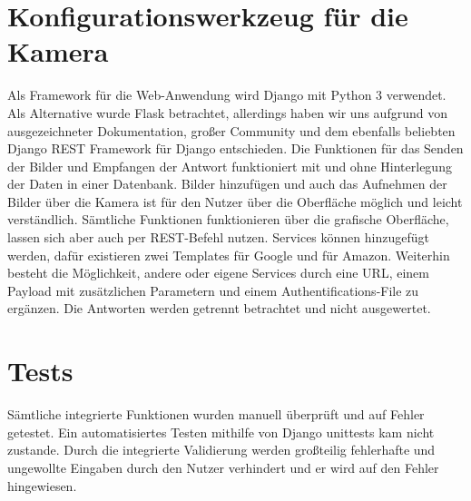 \section{Konfigurationswerkzeug für die Kamera}
Als Framework für die Web-Anwendung wird Django mit Python 3 verwendet. Als Alternative wurde Flask betrachtet, allerdings haben wir uns aufgrund von ausgezeichneter Dokumentation, großer Community und dem ebenfalls beliebten Django REST Framework für Django entschieden.
Die Funktionen für das Senden der Bilder und Empfangen der Antwort funktioniert mit und ohne Hinterlegung der Daten in einer Datenbank. Bilder hinzufügen und auch das Aufnehmen der Bilder über die Kamera ist für den Nutzer über die Oberfläche möglich und leicht verständlich. Sämtliche Funktionen funktionieren über die grafische Oberfläche, lassen sich aber auch per REST-Befehl nutzen. Services können hinzugefügt werden, dafür existieren zwei Templates für Google und für Amazon. Weiterhin besteht die Möglichkeit, andere oder eigene Services durch eine URL, einem Payload mit zusätzlichen Parametern und einem Authentifications-File zu ergänzen.
Die Antworten werden getrennt betrachtet und nicht ausgewertet.

\section{Tests}
Sämtliche integrierte Funktionen wurden manuell überprüft und auf Fehler getestet. Ein automatisiertes Testen mithilfe von Django unittests kam nicht zustande. Durch die integrierte Validierung werden großteilig fehlerhafte und ungewollte Eingaben durch den Nutzer verhindert und er wird auf den Fehler hingewiesen.